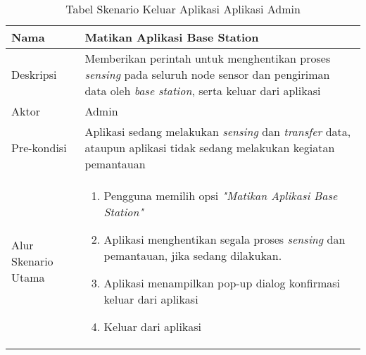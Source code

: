    \begin{table}[H]
        \centering
        \caption{Tabel Skenario Keluar Aplikasi Aplikasi Admin}
        \begin{tabular}{|p{3cm}|p{10cm}|}
        \hline
            Nama & Matikan Aplikasi Base Station\\
        \hline 
        \hline
            Deskripsi & Memberikan perintah untuk menghentikan proses \textit{sensing} pada seluruh node sensor dan pengiriman data oleh \textit{base station}, serta keluar dari aplikasi\\
        \hline
            Aktor & Admin \\
        \hline
            Pre-kondisi & Aplikasi sedang melakukan \textit{sensing} dan \textit{transfer} data, ataupun aplikasi tidak sedang melakukan kegiatan pemantauan \\
        \hline
            Alur Skenario Utama & 
             \begin{enumerate}
                \item Pengguna memilih opsi \textit{"Matikan Aplikasi Base Station"} 
                \item Aplikasi menghentikan segala proses \textit{sensing} dan pemantauan, jika sedang dilakukan.
                \item Aplikasi menampilkan pop-up dialog konfirmasi keluar dari aplikasi
                \item Keluar dari aplikasi
            \end{enumerate}\\
        \hline
        \end{tabular}
        \label{tab:skenario4}
    \end{table}
    
